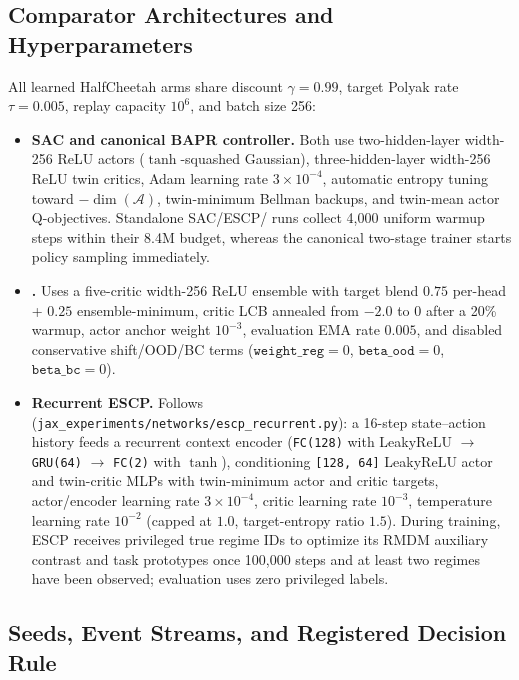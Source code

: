\subsection{Comparator Architectures and Hyperparameters}

All learned HalfCheetah arms share discount $\gamma=0.99$, target Polyak rate $\tau=0.005$, replay capacity $10^6$, and batch size 256:
\begin{itemize}[leftmargin=*]
    \item \textbf{SAC and canonical BAPR controller.} Both use two-hidden-layer width-256 ReLU actors ($\tanh$-squashed Gaussian), three-hidden-layer width-256 ReLU twin critics, Adam learning rate $3\times 10^{-4}$, automatic entropy tuning toward $-\dim(\mathcal{A})$, twin-minimum Bellman backups, and twin-mean actor Q-objectives. Standalone SAC/ESCP/\resacbaseline{} runs collect 4,000 uniform warmup steps within their 8.4M budget, whereas the canonical two-stage trainer starts policy sampling immediately.
    \item \textbf{\resacbaseline{}.} Uses a five-critic width-256 ReLU ensemble with target blend $0.75$ per-head + $0.25$ ensemble-minimum, critic LCB annealed from $-2.0$ to $0$ after a 20\% warmup, actor anchor weight $10^{-3}$, evaluation EMA rate $0.005$, and disabled conservative shift/OOD/BC terms ($\texttt{weight\_reg}=0$, $\texttt{beta\_ood}=0$, $\texttt{beta\_bc}=0$).
    \item \textbf{Recurrent ESCP.} Follows \citet{Luo2022ESCP} (\texttt{jax\_experiments/\allowbreak networks/\allowbreak escp\_recurrent.py}): a 16-step state--action history feeds a recurrent context encoder (\texttt{FC(128)} with LeakyReLU $\to$ \texttt{GRU(64)} $\to$ \texttt{FC(2)} with $\tanh$), conditioning \texttt{[128, 64]} LeakyReLU actor and twin-critic MLPs with twin-minimum actor and critic targets, actor/encoder learning rate $3\times 10^{-4}$, critic learning rate $10^{-3}$, temperature learning rate $10^{-2}$ (capped at $1.0$, target-entropy ratio $1.5$). During training, ESCP receives privileged true regime IDs to optimize its RMDM auxiliary contrast and task prototypes once 100,000 steps and at least two regimes have been observed; evaluation uses zero privileged labels.
\end{itemize}

\subsection{Seeds, Event Streams, and Registered Decision Rule}

